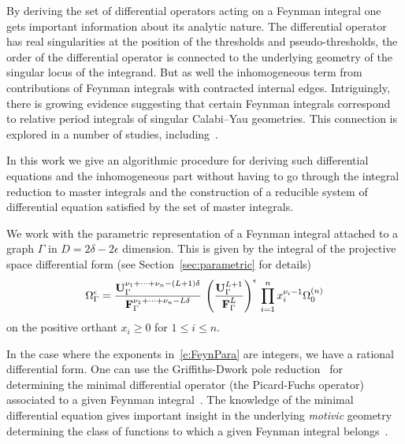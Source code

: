 \documentclass[a4paper,12pt]{article}
\numberwithin{equation}{section}
\numberwithin{figure}{section}
\begin{document}
\medskip
By deriving the set of differential operators acting on a Feynman integral one
gets important information about its analytic nature.
The differential  operator has real singularities at the position of
the thresholds and pseudo-thresholds, the order of the differential
operator is connected to the underlying geometry of the singular locus
of the integrand. But as well the inhomogeneous term from
contributions of Feynman integrals with contracted internal
edges. Intriguingly, there is  growing evidence suggesting that certain
Feynman integrals correspond to relative period integrals of singular
Calabi--Yau geometries. This connection is explored in a number
of studies, including~\cite{Brown:2009ta,Bloch:2014qca,Bloch:2016izu,Bourjaily:2018ycu,Bourjaily:2019hmc,Bourjaily:2018yfy,Klemm:2019dbm,Bonisch:2020qmm,Bonisch:2021yfw,Bourjaily:2022bwx,Forum:2022lpz,Duhr:2022pch,Frellesvig:2023PM}.

In this work we give an algorithmic procedure for deriving such
differential equations and the inhomogeneous part without having to go through the integral
reduction to master integrals and the construction of a reducible
system of differential equation satisfied by the set of master integrals.


We work with the parametric representation of a Feynman integral attached to a
graph $\Gamma$ in $D=2\delta-2\epsilon$ dimension. This  is given by
the integral of the projective space differential form (see
Section~\ref{sec:parametric} for details)
\begin{equation}\label{e:FeynParaIntro}
  \Omega^\epsilon_\Gamma = { \textbf{U}_\Gamma ^{\nu_1+\cdots+\nu_n-(L+1)\delta}  \over \textbf{F}_\Gamma ^{\nu_1+\cdots+\nu_n-L\delta} }\,
  \left(\textbf{U}_\Gamma^{L+1}\over \textbf{F}_\Gamma^{L}\right)^{\epsilon} \, \prod_{i=1}^n x_i^{\nu_i-1} \Omega^{(n)}_0
\end{equation}
on the positive orthant $x_i\geq0$ for $1\leq i\leq n$.


In the case where the exponents in~\eqref{e:FeynPara} are integers,
we have a rational differential form. One can use the  Griffiths-Dwork
pole reduction~\cite{Griffiths_1969,Griffith1,Griffith2,Dwork_1962,Dwork_1964} for determining the minimal differential operator (the
Picard-Fuchs operator) associated to a given Feynman integral~\cite{Bloch:2016izu,Vanhove:2018mto,Lairez:2022zkj}.
The knowledge of the minimal differential equation
gives important insight in the underlying \emph{motivic} geometry
determining the class of functions to which a given Feynman integral
belongs~\cite{Doran:2023yzu}.
\end{document}
